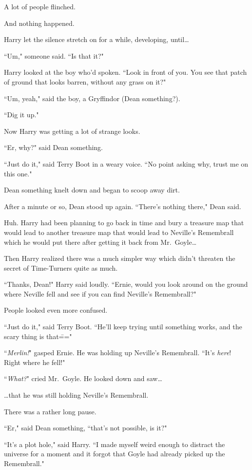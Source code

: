 A lot of people flinched.

And nothing happened.

Harry let the silence stretch on for a while, developing, until{\ldots}

``Um," someone said. ``Is that it?"

Harry looked at the boy who'd spoken. ``Look in front of you. You see that patch of ground that looks barren, without any grass on it?"

``Um, yeah," said the boy, a Gryffindor (Dean something?).

``Dig it up."

Now Harry was getting a lot of strange looks.

``Er, why?" said Dean something.

``Just do it," said Terry Boot in a weary voice. ``No point asking why, trust me on this one."

Dean something knelt down and began to scoop away dirt.

After a minute or so, Dean stood up again. ``There's nothing there," Dean said.

Huh. Harry had been planning to go back in time and bury a treasure map that would lead to another treasure map that would lead to Neville's Remembrall which he would put there after getting it back from Mr.~Goyle{\ldots}

Then Harry realized there was a much simpler way which didn't threaten the secret of Time-Turners quite as much.

``Thanks, Dean!" Harry said loudly. ``Ernie, would you look around on the ground where Neville fell and see if you can find Neville's Remembrall?"

People looked even more confused.

``Just do it," said Terry Boot. ``He'll keep trying until something works, and the scary thing is that\==="

``\emph{Merlin!}" gasped Ernie. He was holding up Neville's Remembrall. ``It's \emph{here}! Right where he fell!"

``\emph{What?}" cried Mr.~Goyle. He looked down and saw{\ldots}

{\ldots}that he was still holding Neville's Remembrall.

There was a rather long pause.

``Er," said Dean something, ``that's not possible, is it?"

``It's a plot hole," said Harry. ``I made myself weird enough to distract the universe for a moment and it forgot that Goyle had already picked up the Remembrall."

